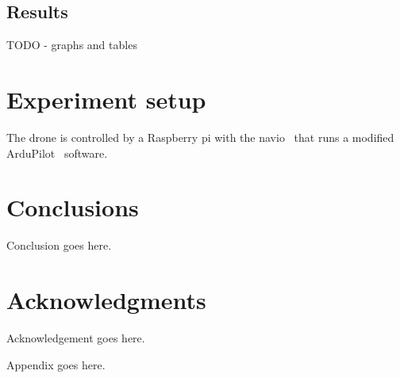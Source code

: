 \documentclass{sig-alternate-ipsn13}
\begin{document}



\subsection{Results}
\label{sec:results}
TODO - graphs and tables

\section{Experiment setup}
\label{sec:Experiment setup}
The drone is controlled by a Raspberry pi with the navio~\cite{??? raspberry, navio} that runs a modified ArduPilot~\cite{??? APM} software.


\section{Conclusions}
Conclusion goes here.


\section*{Acknowledgments}
Acknowledgement goes here.


%

%
%
\appendix

Appendix goes here.

\end{document}
